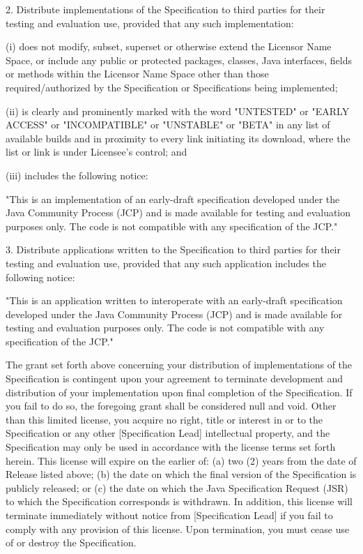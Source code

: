 \begin{flushleft}
   2. Distribute implementations of the Specification to third parties for their testing and evaluation use, provided that any such implementation:

(i) does not modify, subset, superset or otherwise extend the Licensor Name Space, or include any public or protected packages, classes, Java interfaces, fields or methods within the Licensor Name Space other than those required/authorized by the Specification or Specifications being implemented;

(ii) is clearly and prominently marked with the word "UNTESTED" or "EARLY ACCESS" or "INCOMPATIBLE" or "UNSTABLE" or "BETA" in any list of available builds and in proximity to every link initiating its download, where the list or link is under Licensee's control; and

(iii) includes the following notice:

"This is an implementation of an early-draft specification developed under the Java Community Process (JCP) and is made available for testing and evaluation purposes only. The code is not compatible with any specification of the JCP."

   3. Distribute applications written to the Specification to third parties for their testing and evaluation use, provided that any such application includes the following notice:

      "This is an application written to interoperate with an early-draft specification developed under the Java Community Process (JCP) and is made available for testing and evaluation purposes only. The code is not compatible with any specification of the JCP."

The grant set forth above concerning your distribution of implementations of the Specification is contingent upon your agreement to terminate development and distribution of your implementation upon final completion of the Specification.  If you fail to do so, the foregoing grant shall be considered null and void.
Other than this limited license, you acquire no right, title or interest in or to the Specification or any other [Specification Lead] intellectual property, and the Specification may only be used in accordance with the license terms set forth herein. This license will expire on the earlier of:  (a) two (2) years from the date of Release listed above; (b) the date on which the final version of the Specification is publicly released; or (c) the date on which the Java Specification Request (JSR) to which the Specification corresponds is withdrawn.  In addition, this license will terminate immediately without notice from [Specification Lead] if you fail to comply with any provision of this license.  Upon termination, you must cease use of or destroy the Specification.


\end{flushleft}
